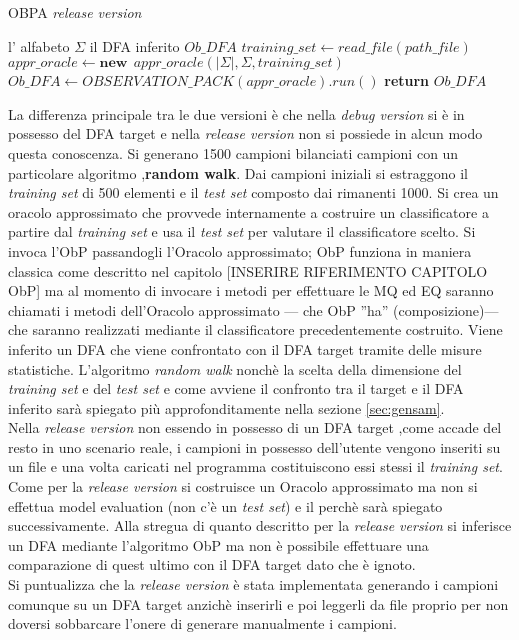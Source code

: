 \begin{algorithm}
\caption{OBPA \textit{release version}}\label{alg:obpar}
\begin{algorithmic}[1]
\Statex
\Input l' alfabeto $\Sigma$
\Output il \ac{DFA} inferito $Ob\_DFA$
\State $training\_set \gets read\_file(path\_file)$ 
\State $appr\_oracle \gets \textbf{new}\:\: appr\_oracle(|\Sigma|,\Sigma,training\_set)$
\State $Ob\_DFA \gets OBSERVATION\_PACK(appr\_oracle).run()$
 \State \textbf{return} $Ob\_DFA$
     
\end{algorithmic}
\end{algorithm}

La differenza principale tra le due versioni è che nella \textit{debug version} si è in possesso del \ac{DFA} target e nella \textit{release version} non si possiede in alcun modo questa conoscenza.  Si generano 1500 campioni bilanciati campioni con un particolare algoritmo ,\textbf{random walk}.  Dai campioni iniziali si estraggono il \textit{training set} di 500 elementi e il \textit{test set} composto dai rimanenti 1000. Si crea un oracolo approssimato che provvede internamente a costruire un classificatore a partire dal \textit{training set} e usa il \textit{test set} per valutare il classificatore scelto. Si invoca l'\ac{ObP} passandogli l'Oracolo approssimato; \ac{ObP} funziona in maniera classica come descritto nel capitolo [INSERIRE RIFERIMENTO CAPITOLO ObP] ma al momento di invocare i metodi per effettuare le \ac{MQ} ed \ac{EQ} saranno chiamati i metodi dell'Oracolo approssimato --- che \ac{ObP} ''ha'' (composizione)--- che saranno realizzati mediante il classificatore precedentemente costruito. Viene inferito un \ac{DFA} che viene confrontato con il \ac{DFA} target tramite delle misure statistiche.  L'algoritmo \textit{random walk} nonchè la scelta della dimensione del \textit{training set} e del \textit{test set}  e come avviene il confronto tra il target e il \ac{DFA} inferito sarà spiegato più approfonditamente nella sezione \ref{sec:gensam}.\\
Nella \textit{release version} non essendo in possesso di un \ac{DFA} target ,come accade del resto in uno scenario reale, i campioni in possesso dell'utente vengono inseriti su un file e una volta caricati nel programma costituiscono essi stessi il \textit{training set}. Come per la \textit{release version} si costruisce un Oracolo approssimato ma non si effettua model evaluation (non c'è un \textit{test set}) e il perchè sarà spiegato successivamente. Alla stregua di quanto descritto per la \textit{release version} si inferisce un \ac{DFA} mediante l'algoritmo \ac{ObP} ma non è possibile effettuare una comparazione di quest ultimo con il \ac{DFA} target dato che è ignoto. \\
Si puntualizza che la \textit{release version} è stata implementata generando i campioni comunque su un \ac{DFA} target anzichè inserirli e poi leggerli da file proprio per non doversi sobbarcare  l'onere di generare manualmente i campioni. 

